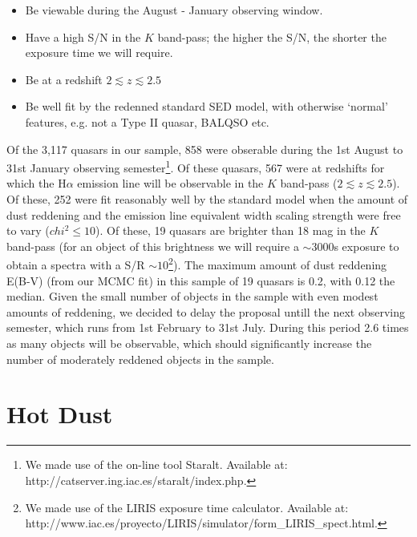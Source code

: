 \begin{itemize}
\item Be viewable during the August - January observing window. 
\item Have a high S/N in the $K$ band-pass; the higher the S/N, the shorter the exposure time we will require. 
\item Be at a redshift $2 \lesssim z \lesssim 2.5$
\item Be well fit by the redenned standard SED model, with otherwise `normal' features, e.g. not a Type II quasar, BALQSO etc.  
\end{itemize}

Of the 3,117 quasars in our sample, 858 were obserable during the 1st August to 31st January observing semester\footnote{We made use of the on-line tool Staralt. Available at: http://catserver.ing.iac.es/staralt/index.php.}. Of these quasars, 567 were at redshifts for which the H$\alpha$ emission line will be observable in the $K$ band-pass ($2 \lesssim z \lesssim 2.5$). Of these, 252 were fit reasonably well by the standard model when the amount of dust reddening and the emission line equivalent width scaling strength were free to vary ($chi^2 \leq 10$). Of these, 19 quasars are brighter than 18 mag in the $K$ band-pass (for an object of this brightness we will require a $\sim 3000$s exposure to obtain a spectra with a S/R $\sim 10$\footnote{We made use of the LIRIS exposure time calculator. Available at: http://www.iac.es/proyecto/LIRIS/simulator/form\_LIRIS\_spect.html.}). The maximum amount of dust reddening E(B-V) (from our MCMC fit) in this sample of 19 quasars is 0.2, with 0.12 the median. Given the small number of objects in the sample with even modest amounts of reddening, we decided to delay the proposal untill the next observing semester, which runs from 1st February to 31st July. During this period 2.6 times as many objects will be observable, which should significantly increase the number of moderately reddened objects in the sample. 

\section{Hot Dust}

